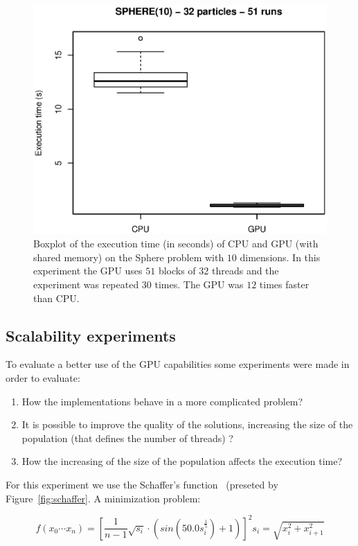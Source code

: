 \documentclass{article}
\begin{document}
    \begin{figure}[!htb]
        \centering
        \includegraphics[width=.7\textwidth]{../img/sphere10_32particles_multi_runs_time.eps}
        \caption{Boxplot of the execution time (in seconds) of CPU and GPU (with shared memory) on the Sphere problem with $10$ dimensions. In this experiment the GPU uses $51$ blocks of $32$ threads and the experiment was repeated $30$ times. The GPU was $12$ times faster than CPU.}
        \label{fig:sphere10_32particles_multi_runs_time}
    \end{figure}


    \subsection{Scalability experiments}

    To evaluate a better use of the GPU capabilities some experiments were made in order to evaluate:
    \begin{enumerate}
        \item How the implementations behave in a more complicated problem?
        \item It is possible to improve the quality of the solutions, increasing the size of the population (that defines the number of threads) ?
        \item How the increasing of the size of the population affects the execution time?
    \end{enumerate}

    For this experiment we use the Schaffer's function~\cite{Schaffer} (preseted by Figure~\ref{fig:schaffer}.
    A minimization problem: 

    \begin{equation}
        f(x_0 \cdots x_n) = [\frac{1}{n-1}\sqrt{s_i} \cdot (sin(50.0s_i^{\frac{1}{5}})+1)]^2 s_i = \sqrt{x_i^2 + x_{i+1}^2}
    \end{equation}
\end{document}
